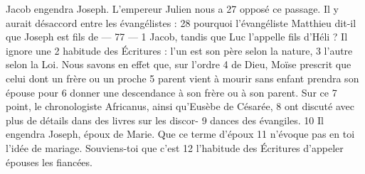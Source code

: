 Jacob engendra Joseph. L'empereur Julien nous a	 
27	 	opposé ce passage. Il y aurait désaccord entre les évangélistes :	 
28	 	pourquoi l'évangéliste Matthieu dit-il que Joseph est fils de	 
 	--- 77 ---	 
1	 	Jacob, tandis que Luc l'appelle fils d'Héli ? Il ignore une	 
2	 	habitude des Écritures : l'un est son père selon la nature,	 
3	 	l'autre selon la Loi. Nous savons en effet que, sur l'ordre	 
4	 	de Dieu, Moïse prescrit que celui dont un frère ou un proche	 
5	 	parent vient à mourir sans enfant prendra son épouse pour	 
6	 	donner une descendance à son frère ou à son parent. Sur ce	 
7	 	point, le chronologiste Africanus, ainsi qu'Eusèbe de Césarée,	 
8	 	ont discuté avec plus de détails dans des livres sur les discor-	 
9	 	dances des évangiles.	 
10	 	Il engendra Joseph, époux de Marie. Que ce terme d'époux	 
11	 	n'évoque pas en toi l'idée de mariage. Souviens-toi que c'est	 
12	 	l'habitude des Écritures d'appeler épouses les fiancées.